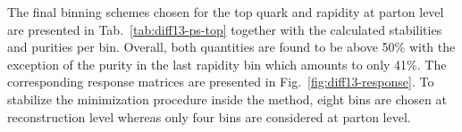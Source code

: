 The final binning schemes chosen for the top quark \pt and rapidity at parton level are presented in Tab.~\ref{tab:diff13-ps-top} together with the calculated stabilities and purities per bin. Overall, both quantities are found to be above 50\% with the exception of the purity in the last rapidity bin which amounts to only 41\%. The corresponding response matrices are presented in Fig.~\ref{fig:diff13-response}. To stabilize the minimization procedure inside the \TUNFOLD method, eight bins are chosen at reconstruction level whereas only four bins are considered at parton level.




